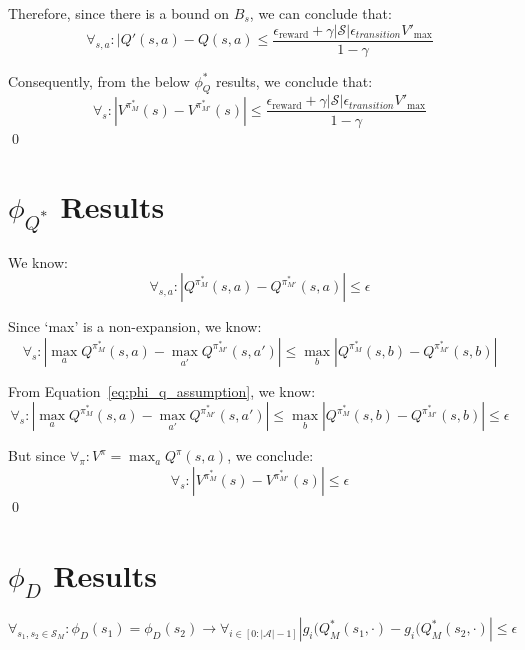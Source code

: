 \documentclass[11pt]{amsart}
\begin{document}
Therefore, since there is a bound on $B_s$, we can conclude that:
\begin{equation}
\forall_{s,a} : |Q'(s,a) - Q(s,a) \leq \frac{{\epsilon_{\text{reward}}} + \gamma |\mathcal{S}|\epsilon_{transition}V'_{\text{max}}}{1-\gamma}
\end{equation}

Consequently, from the below $\phi_Q^*$ results, we conclude that:
\begin{equation}
\forall_s : |V^{\pi^*_M}(s) - V^{\pi^*_{M'}}(s)| \leq \frac{{\epsilon_{\text{reward}}} + \gamma |\mathcal{S}|\epsilon_{transition}V'_{\text{max}}}{1-\gamma}
\end{equation}
\qed


\newpage
\section{$\phi_{Q^*}$ Results}

We know:
\begin{equation}
\forall_{s,a} : | Q^{\pi^*_M}(s,a) - Q^{\pi^*_{M'}}(s,a)| \leq \epsilon
\label{eq:phi_q_assumption}
\end{equation}

Since `max' is a non-expansion, we know:
\begin{equation}
\forall_s : |\max_a Q^{\pi^*_M}(s,a) - \max_{a'} Q^{\pi^*_{M'}}(s,a')| \leq \max_b | Q^{\pi^*_M}(s,b) - Q^{\pi^*_{M'}}(s,b)|
\end{equation}

From Equation~\ref{eq:phi_q_assumption}, we know:
\begin{equation}
\forall_s : |\max_a Q^{\pi^*_M}(s,a) - \max_{a'} Q^{\pi^*_{M'}}(s,a')| \leq \max_b | Q^{\pi^*_M}(s,b) - Q^{\pi^*_{M'}}(s,b)| \leq \epsilon
\end{equation}

But since $\forall_\pi : V^{\pi} = \max_a Q^\pi(s,a)$, we conclude:
\begin{equation}
\forall_s : |V^{\pi^*_M}(s) - V^{\pi^*_{M'}}(s)| \leq \epsilon
\end{equation}
\qed

\newpage
\section{$\phi_{D}$ Results}

\begin{equation}
\forall_{s_1, s_2 \in \mathcal{S}_M} : \phi_D(s_1) = \phi_D(s_2) \rightarrow \forall_{i \in [0:|\mathcal{A}| - 1]} | g_i(Q_M^*(s_1, \cdot) - g_i(Q_M^*(s_2, \cdot) | \leq \epsilon
\label{eq:phi_d}
\end{equation}
\end{document}
